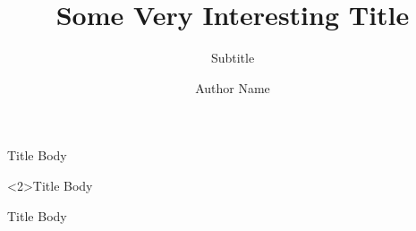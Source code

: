 \documentclass{ltx-talk}
\title{Some Very Interesting Title}
\subtitle{Subtitle}
\author{Author Name}
\institute{Cool Conference}
\begin{document}
\maketitle

\begin{frame}
  \begin{block}{Title}
    Body
  \end{block}
  \begin{alertblock}<2>{Title}
    Body
  \end{alertblock}
  \begin{exampleblock}{Title}
    Body
  \end{exampleblock}
\end{frame}
\end{document}
